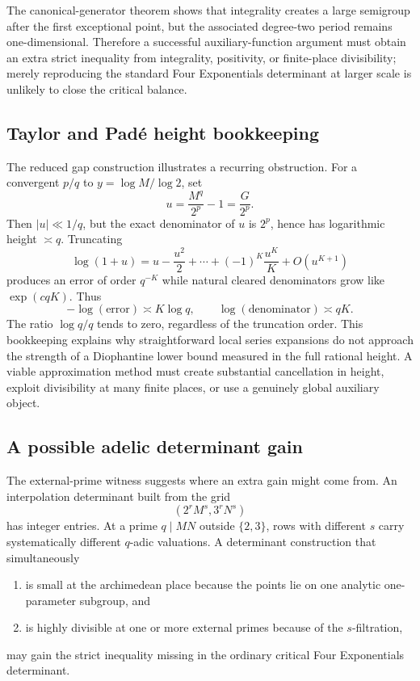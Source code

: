 \documentclass[11pt,oneside]{article}
\theoremstyle{definition}
\begin{document}
The canonical-generator theorem shows that integrality creates a large semigroup after the first exceptional point, but the associated degree-two period remains one-dimensional.  Therefore a successful auxiliary-function argument must obtain an extra strict inequality from integrality, positivity, or finite-place divisibility; merely reproducing the standard Four Exponentials determinant at larger scale is unlikely to close the critical balance.

\subsection{Taylor and Pad\'e height bookkeeping}

The reduced gap construction illustrates a recurring obstruction.  For a convergent $p/q$ to $y=\log M/\log2$, set
\[
 u=\frac{M^q}{2^p}-1=\frac{G}{2^p}.
\]
Then $|u|\ll1/q$, but the exact denominator of $u$ is $2^p$, hence has logarithmic height $\asymp q$.  Truncating
\[
 \log(1+u)=u-\frac{u^2}{2}+\cdots+(-1)^{K}\frac{u^K}{K}+O(u^{K+1})
\]
produces an error of order $q^{-K}$ while natural cleared denominators grow like $\exp(cqK)$.  Thus
\[
  -\log(\text{error})\asymp K\log q,
  \qquad
  \log(\text{denominator})\asymp qK.
\]
The ratio $\log q/q$ tends to zero, regardless of the truncation order.  This bookkeeping explains why straightforward local series expansions do not approach the strength of a Diophantine lower bound measured in the full rational height.  A viable approximation method must create substantial cancellation in height, exploit divisibility at many finite places, or use a genuinely global auxiliary object.

\subsection{A possible adelic determinant gain}

The external-prime witness suggests where an extra gain might come from.  An interpolation determinant built from the grid
\[
 (2^rM^s,3^rN^s)
\]
has integer entries.  At a prime $q\mid MN$ outside $\{2,3\}$, rows with different $s$ carry systematically different $q$-adic valuations.  A determinant construction that simultaneously
\begin{enumerate}
\item is small at the archimedean place because the points lie on one analytic one-parameter subgroup, and
\item is highly divisible at one or more external primes because of the $s$-filtration,
\end{enumerate}
may gain the strict inequality missing in the ordinary critical Four Exponentials determinant.
\end{document}
